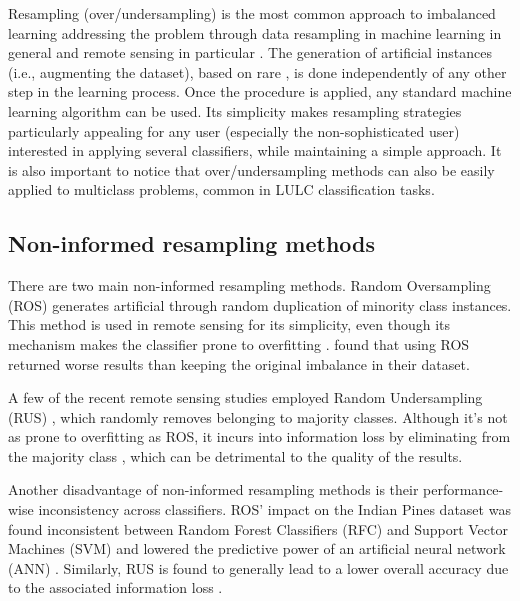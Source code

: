 \documentclass[remotesensing,article,submit,moreauthors,pdftex]{Definitions/mdpi}
\begin{document}
\begin{paracol}{2}
Resampling (over/undersampling) is the most common approach to imbalanced
learning addressing the problem through data resampling in machine learning in
general and remote sensing in particular \cite{Feng2019}. The generation of
artificial instances (i.e., augmenting the dataset), based on rare
,
is done independently of any other step in the learning process. Once the
procedure is applied, any standard machine learning algorithm can be used. Its
simplicity makes resampling strategies particularly appealing for any user
(especially the non-sophisticated user) interested in applying several
classifiers, while maintaining a simple approach.  It is also important to
notice that over/undersampling methods can also be easily applied to
multiclass problems, common in LULC classification tasks.

\subsection{Non-informed resampling methods}

There are two main non-informed resampling methods. Random Oversampling (ROS)
generates artificial through random
duplication of minority class instances. This method is used in remote sensing
\cite{Sharififar2019, Hounkpatin2018} for its simplicity, even though its
mechanism makes the classifier prone to overfitting \cite{Krawczyk2016}.
\cite{Hounkpatin2018} found that using ROS returned worse results than keeping
the original imbalance in their dataset.

A few of the recent remote sensing studies employed Random Undersampling (RUS)
\cite{Ferreira2019}, which randomly removes belonging to majority classes. Although it's not as prone to
overfitting as ROS, it incurs into information loss by eliminating from the majority class \cite{Feng2019}, which can be
detrimental to the quality of the results.

Another disadvantage of non-informed resampling methods is their
performance-wise inconsistency across classifiers. ROS' impact on the Indian
Pines dataset was found inconsistent between Random Forest Classifiers (RFC)
and Support Vector Machines (SVM) and lowered the predictive power of an
artificial neural network (ANN) \cite{Maxwell2018}. Similarly, RUS is found to
generally lead to a lower overall accuracy due to the associated information
loss \cite{Maxwell2018}.


\end{paracol}
\end{document}

